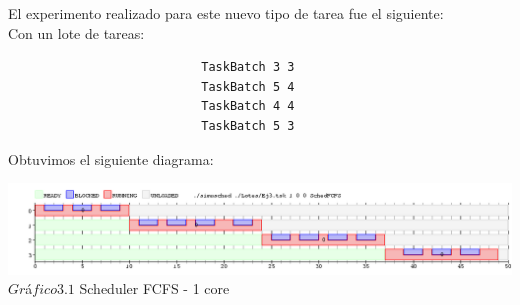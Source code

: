  \indent El experimento realizado para este nuevo tipo de tarea fue el siguiente:\\
 
 Con un lote de tareas:\\
 
 \begin{verbatim}
                           TaskBatch 3 3
                           TaskBatch 5 4
                           TaskBatch 4 4
                           TaskBatch 5 3
 \end{verbatim}

 Obtuvimos el siguiente diagrama:\\
 
 \vspace*{0.3cm} \vspace*{0.3cm}
  \begin{center}
 \includegraphics[scale=0.5]{ej3.png}
 { $Gr$\'a$fico 3.1$ Scheduler FCFS - 1 core }
 \end{center}
  \vspace*{0.3cm}
 
